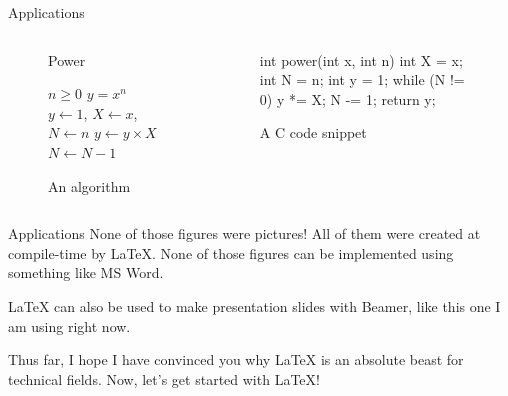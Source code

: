 \documentclass[10pt,xcolor={dvipsnames}, aspectratio=169]{beamer}
\begin{document}
	\begin{frame}[fragile]{Applications}
		\begin{columns}[T]
        \begin{column}{0.5 \textwidth}
        \begin{figure}
	 	\begin{center}
	 	\begin{algorithm}[H]
        \caption{Power}
        \begin{algorithmic}
\smallskip
\Require $n \geq 0$
\Ensure $y = x^n$
\State $y \gets 1$, \State $X \gets x$, \State $N \gets n$
    \State $y \gets y \times X$
    \State $N \gets N - 1$
\EndWhile
\smallskip
        \end{algorithmic}
        \end{algorithm}
        \end{center}
	 	\caption{An algorithm}
	 	\end{figure}
        \end{column}
        \begin{column}{0.5 \textwidth}
        \begin{figure}
            \centering
            \vspace{0.9cm}
                        \begin{ccode}
int power(int x, int n) {
    int X = x;
    int N = n;
    int y = 1;
    while (N != 0) {
        y *= X;
        N -= 1;
    }
    return y;
}
            \end{ccode}
            \caption{A C code snippet}
        \end{figure}
        \end{column}
        \end{columns}
    \end{frame}
	\begin{frame}{Applications}
	    None of those figures were pictures! All of them were created at compile-time by \LaTeX. None of those figures can be implemented using something like MS Word.
	    
	    \LaTeX \xspace can also be used to make presentation slides with \textcolor{latexBird}{Beamer}, like this one I am using right now.
	    
	    Thus far, I hope I have convinced you why \LaTeX \xspace is an absolute beast for technical fields. Now, let's get started with \LaTeX!
    \end{frame}
\end{document}
